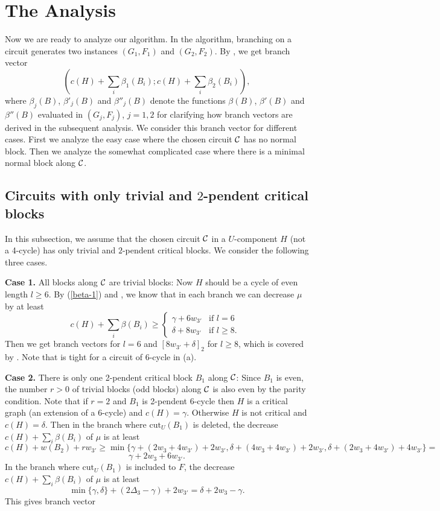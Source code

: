 \documentclass[runningheads]{llncs}
\begin{document}
\section{The Analysis}Now we are ready to analyze our algorithm.
In the algorithm,   branching on a circuit  generates two instances $(G_1,F_1)$ and $(G_2,F_2)$.
By , we get branch vector
$$(c(H)+\sum_i \beta_1(B_i); c(H)+\sum_i \beta_2(B_i)),
$$
where  $\beta_j(B)$, $\beta'_j(B)$ and $\beta''_j(B)$  denote
the functions $\beta(B)$, $\beta'(B)$ and $\beta''(B)$ evaluated in $(G_j,F_j)$, $j=1,2$
for clarifying how branch vectors are derived in the subsequent analysis.
We consider this branch vector for different cases.
First we analyze the easy case where the chosen circuit ${\cal C}$ has no normal block.
Then  we analyze the somewhat complicated case
where there is a minimal normal block along ${\cal C}$.

\subsection{Circuits with only trivial and $2$-pendent critical blocks}
In this subsection, we assume that the chosen circuit ${\cal C}$ in a $U$-component $H$ (not a 4-cycle)
has only trivial and $2$-pendent critical blocks.
We consider the following three cases.

{\bf Case 1.} All blocks along ${\cal C}$ are trivial blocks: Now $H$ should be a cycle of even length $l\geq 6$.
By (\ref{beta-1}) and , we know that
in each branch we can decrease $\mu$ by at least
 \[ c(H)+\sum_i \beta(B_i)
\geq \left\{ \begin{array}{cl}
 \gamma+ 6 w_{3'}& \mbox{if  $l=6$ }\\
 \delta +8 w_{3'} & \mbox{if $l\geq 8$.}   \end{array}
\right.\]
Then we get branch vectors
for  $l=6$
and $[ 8w_{3'}+\delta]_2$ for $l\geq 8$,
 which is covered by .
Note that  is tight for a circuit of 6-cycle in (a).


{\bf Case 2.} There is only one 2-pendent critical block $B_1$ along ${\cal C}$:
Since $B_1$ is even, the number $r>0$ of trivial blocks (odd blocks) along ${\cal C}$ is also even by the parity condition.
Note that if $r=2$ and $B_1$ is 2-pendent 6-cycle then $H$ is a critical graph (an extension of a 6-cycle) and $c(H)=\gamma$. Otherwise $H$ is not critical and $c(H)=\delta$.
Then in the branch where $\mathrm{cut}_U(B_1)$ is deleted, the  decrease $c(H)+\sum_i \beta(B_i)$ of $\mu$ is at least
$c(H)+w(B_2)+r w_{3'}
\geq \min\{ \gamma+ (2w_3+4w_{3'})+2w_{3'}, \delta + (4w_3+ 4w_{3'})+2w_{3'}, \delta +  (2w_3+4 w_{3'})+4 w_{3'} \}
=$
\[\gamma+ 2w_3+6 w_{3'}.
\]
In the branch where $\mathrm{cut}_U(B_1)$ is included to $F$, the  decrease $c(H)+\sum_i \beta(B_i)$ of $\mu$ is at least
\[\min\{ \gamma, \delta\}+ (2\Delta_{3}-\gamma)+2 w_{3'}=\delta+2w_3-\gamma.
\]
This gives branch vector
\end{document}
